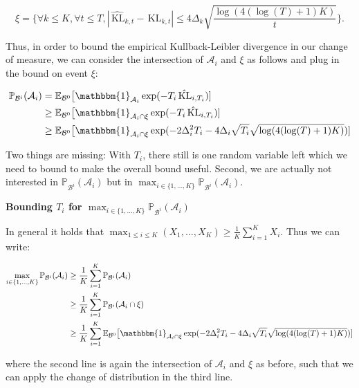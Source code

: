 \documentclass[11pt,]{article}
\newcommand{\KL}{\,\text{KL}}
\begin{document}
\begin{equation}
\xi = \{ \forall k \leq K, \forall t \leq T, |\hat{\KL}_{k,t} - \KL_{k,t}| \leq 4 \Delta_k \sqrt{\frac{\log(4(\log(T)+1)K)}{t}}\}. \label{LocatelliTheorem1EventXi}
\end{equation}

Thus, in order to bound the empirical Kullback-Leibler divergence in our
change of measure, we can consider the intersection of \(\mathcal{A}_i\)
and \(\xi\) as follows and plug in the bound on event \(\xi\):

\begin{align*}
\mathbb{P}_{\mathcal{B}^i}(\mathcal{A}_i) & = \mathbb{E}_{\mathcal{B}^0} \big[\mathbbm{1}_{\mathcal{A}_i} \exp (- T_i \hat{\KL}_{i,T_i}) ] \\
& \geq \mathbb{E}_{\mathcal{B}^0} \big[\mathbbm{1}_{\mathcal{A}_i \cap \xi} \exp (- T_i \hat{\KL}_{i,T_i}) ] \\
& \geq \mathbb{E}_{\mathcal{B}^0} \big[\mathbbm{1}_{\mathcal{A}_i \cap \xi} \exp (- 2 \Delta_i^2 T_i - 4 \Delta_i \sqrt{T_i} \sqrt{\log(4(\log(T)+1)K)}) ]
\end{align*}

Two things are missing: With \(T_i\), there still is one random variable
left which we need to bound to make the overall bound useful. Second, we
are actually not interested in
\(\mathbb{P}_{\mathcal{B}^i}(\mathcal{A}_i)\) but in
\(\max_{i \in \{1,\dots,K\}} \mathbb{P}_{\mathcal{B}^i}(\mathcal{A}_i)\).

\textbf{Bounding \(T_i\) for
\(\max_{i \in \{1,\dots,K\}}\mathbb{P}_{\mathcal{B}^i}(\mathcal{A}_i)\)}

In general it holds that
\(\max_{1 \leq i \leq K} (X_1, \dots, X_K) \geq \frac{1}{K}\sum_{i=1}^K X_i\).
Thus we can write:

\begin{align*}
\max_{i \in \{1,\dots,K\}} \mathbb{P}_{\mathcal{B}^i}(\mathcal{A}_i) & \geq \frac{1}{K} \sum_{i=1}^{K} \mathbb{P}_{\mathcal{B}^i}(\mathcal{A}_i) \\
& \geq \frac{1}{K} \sum_{i=1}^{K} \mathbb{P}_{\mathcal{B}^i}(\mathcal{A}_i \cap \xi) \\
& \geq \frac{1}{K} \sum_{i=1}^{K} \mathbb{E}_{\mathcal{B}^0} \big[\mathbbm{1}_{\mathcal{A}_i \cap \xi} \exp (- 2 \Delta_i^2 T_i - 4 \Delta_i \sqrt{T_i} \sqrt{\log(4(\log(T)+1)K)}) ]
\end{align*}

where the second line is again the intersection of \(\mathcal{A}_i\) and
\(\xi\) as before, such that we can apply the change of distribution in
the third line.
\end{document}
